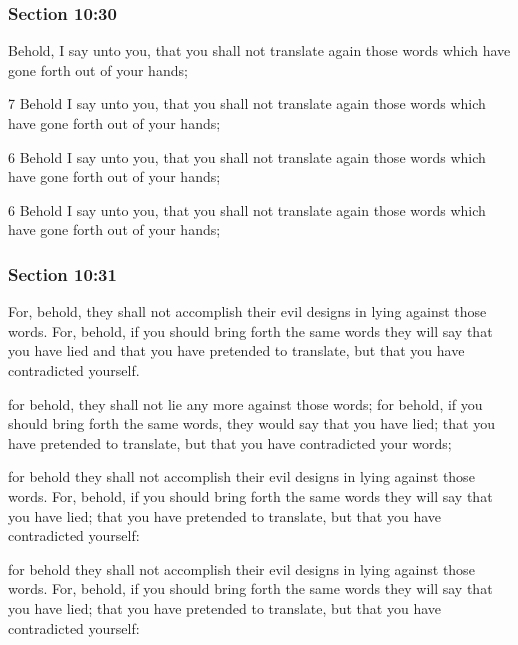 	\subsubsection{Section 10:30} %
		\label{DC10-30}

		Behold, I say unto you, that you shall not translate again those words which have gone forth out of your hands;

		\begin{framed}
		\scriptsize
			\begin{compactdesc}
				\item[JSP] 7 Behold I say unto you, that you shall not translate again those words which have gone forth out of your hands;
				\item[RB1] [\textit{missing}] 
				\item[DC 1835] 6 Behold I say unto you, that you shall not translate again those words which have gone forth out of your hands;
				\item[DC 1844] 6 Behold I say unto you, that you shall not translate again those words which have gone forth out of your hands;
			\end{compactdesc}
		\end{framed}

	\subsubsection{Section 10:31} %
		\label{DC10-31}

		For, behold, they shall not accomplish their evil designs in lying against those words.  For, behold, if you should bring forth the same words they will say that you have lied and that you have pretended to translate, but that you have contradicted yourself.

		\begin{framed}
		\scriptsize
			\begin{compactdesc}
				\item[JSP] for behold, they shall not lie any more against those words; for behold, if you should bring forth the same words, they would say that you have lied; that you have pretended to translate, but that you have contradicted your words;
				\item[RB1] [\textit{missing}] 
				\item[DC 1835] for behold they shall not accomplish their evil designs in lying against those words. For, behold, if you should bring forth the same words they will say that you have lied; that you have pretended to translate, but that you have contradicted yourself:
				\item[DC 1844] for behold they shall not accomplish their evil designs in lying against those words. For, behold, if you should bring forth the same words they will say that you have lied; that you have pretended to translate, but that you have contradicted yourself:
			\end{compactdesc}
		\end{framed}


